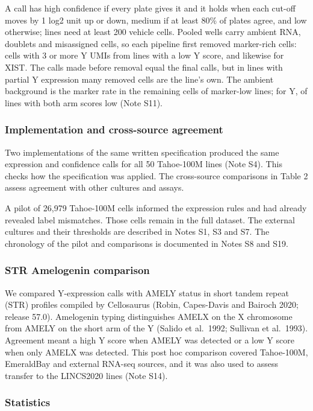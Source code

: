\documentclass[
  11pt,
  letterpaper,
]{article}
\begin{document}
A call has high confidence if every plate gives it and it holds when
each cut-off moves by 1 log2 unit up or down, medium if at least 80\% of
plates agree, and low otherwise; lines need at least 200 vehicle cells.
Pooled wells carry ambient RNA, doublets and misassigned cells, so each
pipeline first removed marker-rich cells: cells with 3 or more Y UMIs
from lines with a low Y score, and likewise for XIST. The calls made
before removal equal the final calls, but in lines with partial Y
expression many removed cells are the line's own. The ambient background
is the marker rate in the remaining cells of marker-low lines; for Y, of
lines with both arm scores low (Note S11).

\subsubsection{Implementation and cross-source
agreement}\label{implementation-and-cross-source-agreement}

Two implementations of the same written specification produced the same
expression and confidence calls for all 50 Tahoe-100M lines (Note S4).
This checks how the specification was applied. The cross-source
comparisons in Table 2 assess agreement with other cultures and assays.

A pilot of 26,979 Tahoe-100M cells informed the expression rules and had
already revealed label mismatches. Those cells remain in the full
dataset. The external cultures and their thresholds are described in
Notes S1, S3 and S7. The chronology of the pilot and comparisons is
documented in Notes S8 and S19.

\subsubsection{STR Amelogenin
comparison}\label{str-amelogenin-comparison}

We compared Y-expression calls with AMELY status in short tandem repeat
(STR) profiles compiled by Cellosaurus (Robin, Capes-Davis and Bairoch
2020; release 57.0). Amelogenin typing distinguishes AMELX on the X
chromosome from AMELY on the short arm of the Y (Salido et al.~1992;
Sullivan et al.~1993). Agreement meant a high Y score when AMELY was
detected or a low Y score when only AMELX was detected. This post hoc
comparison covered Tahoe-100M, EmeraldBay and external RNA-seq sources,
and it was also used to assess transfer to the LINCS2020 lines (Note
S14).

\subsubsection{Statistics}\label{statistics}
\end{document}
